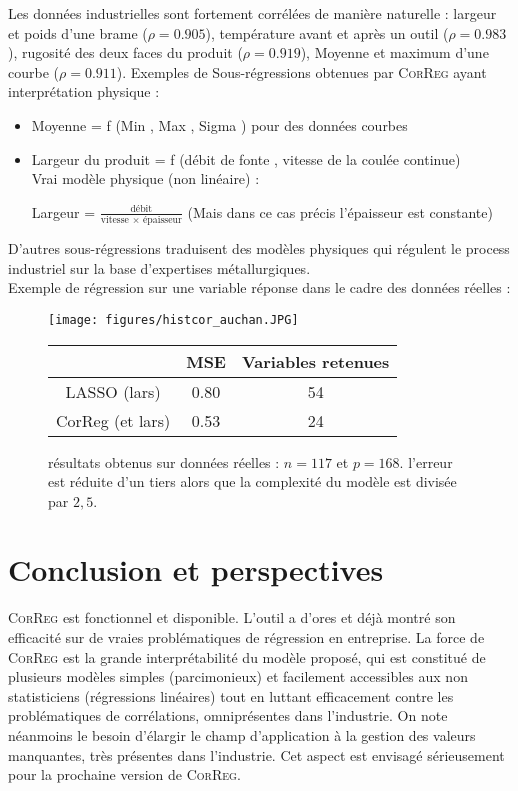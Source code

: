 \documentclass[12pt]{article}
\begin{document}
Les données industrielles sont fortement corrélées de manière naturelle : largeur et poids d'une brame ($\rho=0.905$), température avant et après un outil ($\rho=0.983$), rugosité des deux faces du produit ($\rho=0.919$), Moyenne et maximum d'une courbe ($\rho=0.911$).
Exemples de Sous-régressions obtenues par \textsc{CorReg} ayant interprétation physique :
\begin{itemize}
	\item Moyenne = f (Min , Max , Sigma ) pour des données courbes
	\item Largeur du produit = f (débit de fonte , vitesse de la coulée continue)	\\
Vrai modèle physique (non linéaire) :

	 Largeur = $\frac{\textrm{débit}}{\textrm{vitesse } \times \textrm{ épaisseur}}$ (Mais dans ce cas précis l'épaisseur est constante)
			\end{itemize}
			
			D'autres sous-régressions traduisent des modèles physiques qui régulent le process industriel sur la base d'expertises métallurgiques.
\\

Exemple de régression sur une variable réponse dans le cadre des données réelles :
\begin{figure}[!h]
	\begin{minipage}[c]{.40\linewidth}
			\texttt{[image: figures/histcor\_auchan.JPG]} 
	\end{minipage} \hfill
   \begin{minipage}[c]{.52\linewidth}
		\begin{tabular}{|c|c|c|}
		\hline 
		  & MSE  & Variables retenues  \\ 
		\hline
		LASSO (lars) & 0.80 & 54 \\ 
		\hline 
		CorReg (et lars) & 0.53 & 24  \\ 
		\hline 
		\end{tabular} 
   \end{minipage}
   \caption{résultats obtenus sur données réelles : $n=117$ et $p=168$. l'erreur est réduite d'un tiers alors que la complexité du modèle est divisée par $2,5$.   }
\end{figure}   
	

\section{Conclusion et perspectives}
	\textsc{CorReg} est fonctionnel et disponible. L'outil a d'ores et déjà montré son efficacité sur de vraies problématiques de régression en entreprise.
	La force de \textsc{CorReg} est la grande interprétabilité du modèle proposé, qui est constitué de plusieurs modèles simples (parcimonieux) et facilement accessibles aux non statisticiens (régressions linéaires) tout en luttant efficacement contre les problématiques de corrélations, omniprésentes dans l'industrie.
	On note néanmoins le besoin d'élargir le champ d'application à la gestion des valeurs manquantes, très présentes dans l'industrie. Cet aspect est envisagé sérieusement pour la prochaine version de \textsc{CorReg}.
	
\end{document}
